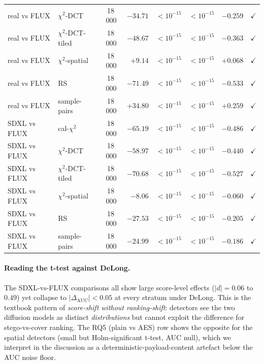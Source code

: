 \documentclass[10pt,twocolumn,a4paper]{article}
\begin{document}
\begin{table}[!htbp]
\begin{tabular}{@{}l l c r r r r r@{}}
real vs FLUX   & $\chi^2$-DCT       & 18\,000 & $-34.71$ & $<\!10^{-15}$ & $<\!10^{-15}$ & $-0.259$ & $\checkmark$ \\
real vs FLUX   & $\chi^2$-DCT-tiled & 18\,000 & $-48.67$ & $<\!10^{-15}$ & $<\!10^{-15}$ & $-0.363$ & $\checkmark$ \\
real vs FLUX   & $\chi^2$-spatial   & 18\,000 & $+9.14$  & $<\!10^{-15}$ & $<\!10^{-15}$ & $+0.068$ & $\checkmark$ \\
real vs FLUX   & RS                 & 18\,000 & $-71.49$ & $<\!10^{-15}$ & $<\!10^{-15}$ & $-0.533$ & $\checkmark$ \\
real vs FLUX   & sample-pairs       & 18\,000 & $+34.80$ & $<\!10^{-15}$ & $<\!10^{-15}$ & $+0.259$ & $\checkmark$ \\
\midrule
SDXL vs FLUX   & cal-$\chi^2$       & 18\,000 & $-65.19$ & $<\!10^{-15}$ & $<\!10^{-15}$ & $-0.486$ & $\checkmark$ \\
SDXL vs FLUX   & $\chi^2$-DCT       & 18\,000 & $-58.97$ & $<\!10^{-15}$ & $<\!10^{-15}$ & $-0.440$ & $\checkmark$ \\
SDXL vs FLUX   & $\chi^2$-DCT-tiled & 18\,000 & $-70.68$ & $<\!10^{-15}$ & $<\!10^{-15}$ & $-0.527$ & $\checkmark$ \\
SDXL vs FLUX   & $\chi^2$-spatial   & 18\,000 & $-8.06$  & $<\!10^{-15}$ & $<\!10^{-15}$ & $-0.060$ & $\checkmark$ \\
SDXL vs FLUX   & RS                 & 18\,000 & $-27.53$ & $<\!10^{-15}$ & $<\!10^{-15}$ & $-0.205$ & $\checkmark$ \\
SDXL vs FLUX   & sample-pairs       & 18\,000 & $-24.99$ & $<\!10^{-15}$ & $<\!10^{-15}$ & $-0.186$ & $\checkmark$ \\
\bottomrule
\end{tabular}
\end{table}

\paragraph{Reading the t-test against DeLong.} The SDXL-vs-FLUX comparisons all show large score-level effects ($|d|\!=\!0.06$ to $0.49$) yet collapse to $|\Delta_\text{AUC}|\!<\!0.05$ at every stratum under DeLong. This is the textbook pattern of \emph{score-shift without ranking-shift}: detectors see the two diffusion models as distinct \emph{distributions} but cannot exploit the difference for stego-vs-cover ranking. The RQ5 (plain vs AES) row shows the opposite for the spatial detectors (small but Holm-significant t-test, AUC null), which we interpret in the discussion as a deterministic-payload-content artefact below the AUC noise floor.
\end{document}
